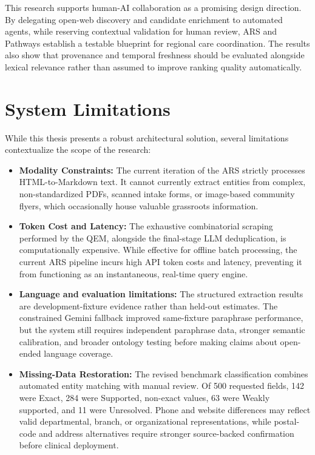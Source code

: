 \documentclass[12pt,oneside]{report}
\begin{document}
This research supports human-AI collaboration as a promising design direction. By delegating open-web discovery and candidate enrichment to automated agents, while reserving contextual validation for human review, ARS and Pathways establish a testable blueprint for regional care coordination. The results also show that provenance and temporal freshness should be evaluated alongside lexical relevance rather than assumed to improve ranking quality automatically.

\section{System Limitations}
While this thesis presents a robust architectural solution, several limitations contextualize the scope of the research:
\begin{itemize}
    \item \textbf{Modality Constraints:} The current iteration of the ARS strictly processes HTML-to-Markdown text. It cannot currently extract entities from complex, non-standardized PDFs, scanned intake forms, or image-based community flyers, which occasionally house valuable grassroots information.
    \item \textbf{Token Cost and Latency:} The exhaustive combinatorial scraping performed by the QEM, alongside the final-stage LLM deduplication, is computationally expensive. While effective for offline batch processing, the current ARS pipeline incurs high API token costs and latency, preventing it from functioning as an instantaneous, real-time query engine.
    \item \textbf{Language and evaluation limitations:} The structured extraction results are development-fixture evidence rather than held-out estimates. The constrained Gemini fallback improved same-fixture paraphrase performance, but the system still requires independent paraphrase data, stronger semantic calibration, and broader ontology testing before making claims about open-ended language coverage.
    \item \textbf{Missing-Data Restoration:} The revised benchmark classification combines automated entity matching with manual review. Of 500 requested fields, 142 were Exact, 284 were Supported, non-exact values, 63 were Weakly supported, and 11 were Unresolved. Phone and website differences may reflect valid departmental, branch, or organizational representations, while postal-code and address alternatives require stronger source-backed confirmation before clinical deployment.
\end{itemize}
\end{document}
